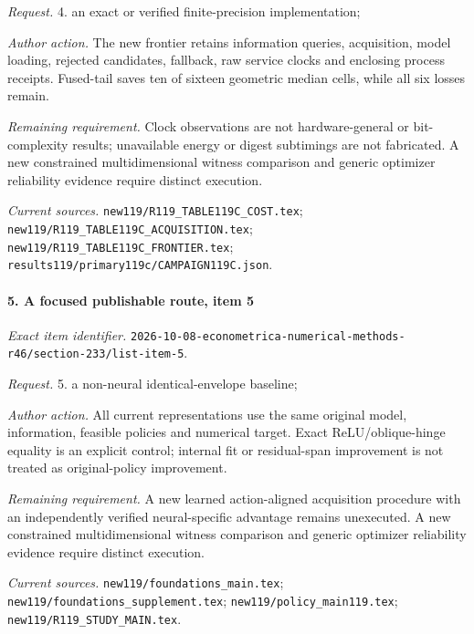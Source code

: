 \par\emph{Request.} 4. an exact or verified finite-precision implementation;

\par\emph{Author action.} The new frontier retains information queries, acquisition, model loading, rejected candidates, fallback, raw service clocks and enclosing process receipts. Fused-tail saves ten of sixteen geometric median cells, while all six losses remain.

\par\emph{Remaining requirement.} Clock observations are not hardware-general or bit-complexity results; unavailable energy or digest subtimings are not fabricated. A new constrained multidimensional witness comparison and generic optimizer reliability evidence require distinct execution.

\par\emph{Current sources.} \nolinkurl{new119/R119_TABLE119C_COST.tex}; \nolinkurl{new119/R119_TABLE119C_ACQUISITION.tex}; \nolinkurl{new119/R119_TABLE119C_FRONTIER.tex}; \nolinkurl{results119/primary119c/CAMPAIGN119C.json}.

\paragraph{5. A focused publishable route, item 5}

\emph{Exact item identifier.} \nolinkurl{2026-10-08-econometrica-numerical-methods-r46/section-233/list-item-5}.

\par\emph{Request.} 5. a non-neural identical-envelope baseline;

\par\emph{Author action.} All current representations use the same original model, information, feasible policies and numerical target. Exact ReLU/\allowbreak{}oblique-hinge equality is an explicit control; internal fit or residual-span improvement is not treated as original-policy improvement.

\par\emph{Remaining requirement.} A new learned action-aligned acquisition procedure with an independently verified neural-specific advantage remains unexecuted. A new constrained multidimensional witness comparison and generic optimizer reliability evidence require distinct execution.

\par\emph{Current sources.} \nolinkurl{new119/foundations_main.tex}; \nolinkurl{new119/foundations_supplement.tex}; \nolinkurl{new119/policy_main119.tex}; \nolinkurl{new119/R119_STUDY_MAIN.tex}.

